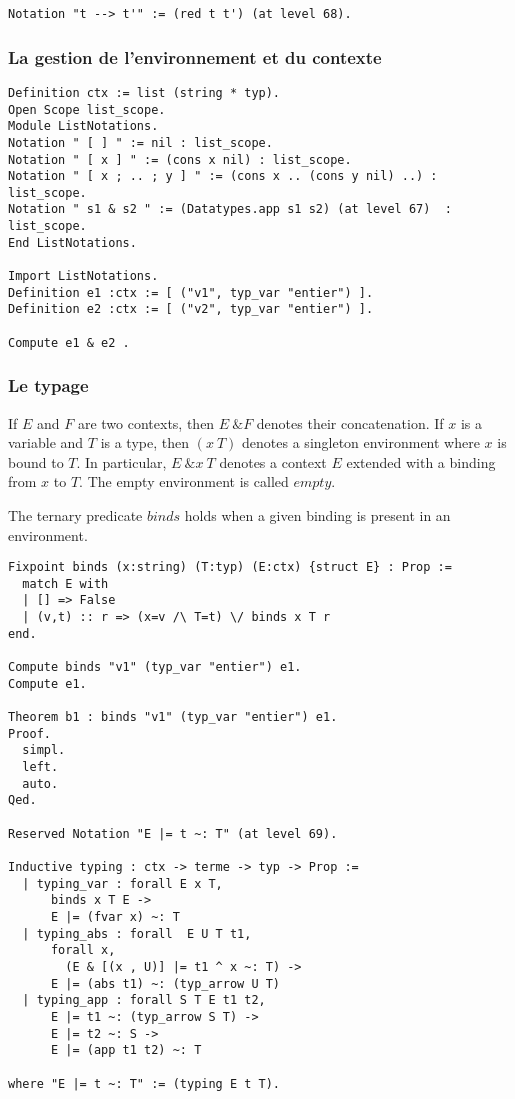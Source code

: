 \begin{Verbatim}
Notation "t --> t'" := (red t t') (at level 68).
\end{Verbatim}

\subsubsection{La gestion de l'environnement et du contexte}
    
\begin{Verbatim}
Definition ctx := list (string * typ).
Open Scope list_scope.
Module ListNotations.
Notation " [ ] " := nil : list_scope.
Notation " [ x ] " := (cons x nil) : list_scope.
Notation " [ x ; .. ; y ] " := (cons x .. (cons y nil) ..) : list_scope.
Notation " s1 & s2 " := (Datatypes.app s1 s2) (at level 67)  : list_scope.
End ListNotations.

Import ListNotations.
Definition e1 :ctx := [ ("v1", typ_var "entier") ].
Definition e2 :ctx := [ ("v2", typ_var "entier") ].

Compute e1 & e2 .
\end{Verbatim}

\subsubsection{Le typage} 

 If $E$ and $F$ are two contexts, then $E\ \& F$ denotes their 
    concatenation. If $x$ is a variable and $T$ is a type, then 
    $(x ~ T)$ denotes a singleton environment where $x$ is bound to $T$.
    In particular, $E\ \& x ~ T$ denotes a context $E$ extended 
    with a binding from $x$ to $T$. The empty environment is 
    called $empty$.

The ternary predicate $binds$ holds when a given binding is
    present in an environment.  

\begin{Verbatim}
Fixpoint binds (x:string) (T:typ) (E:ctx) {struct E} : Prop :=
  match E with
  | [] => False
  | (v,t) :: r => (x=v /\ T=t) \/ binds x T r
end.

Compute binds "v1" (typ_var "entier") e1.
Compute e1.

Theorem b1 : binds "v1" (typ_var "entier") e1.
Proof.
  simpl.
  left.
  auto.
Qed.

Reserved Notation "E |= t ~: T" (at level 69).

Inductive typing : ctx -> terme -> typ -> Prop :=
  | typing_var : forall E x T,
      binds x T E ->
      E |= (fvar x) ~: T
  | typing_abs : forall  E U T t1,
      forall x,  
        (E & [(x , U)] |= t1 ^ x ~: T) ->
      E |= (abs t1) ~: (typ_arrow U T)
  | typing_app : forall S T E t1 t2,
      E |= t1 ~: (typ_arrow S T) -> 
      E |= t2 ~: S ->
      E |= (app t1 t2) ~: T

where "E |= t ~: T" := (typing E t T).
\end{Verbatim}

